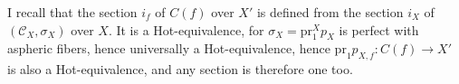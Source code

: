 \documentclass[11pt]{article}
\begin{document}
I recall that the section $i_f$ of $C(f)$ over $X'$ is defined from the section $i_X$ of $(\mathcal{C}_X,\sigma_X)$ over $X$. It is a Hot-equivalence, for $\sigma_X = \mathrm{pr}_1^X p_X$ is perfect with aspheric fibers, hence universally a Hot-equivalence, hence $\mathrm{pr}_1 p_{X,f} : C(f) \longrightarrow X'$ is also a Hot-equivalence, and any section is therefore one too.
\end{document}
